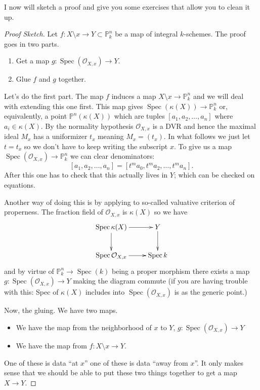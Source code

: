 \documentclass[12pt]{article}
\numberwithin{equation}{section}
\theoremstyle{definition}
\theoremstyle{remark}
\newcommand{\Ocal}{\mathcal{O}}
\newcommand{\PP}{\mathbb{P}}
\newcommand{\Spec}{\operatorname{Spec}}
\begin{document}
I now will sketch a proof and give you some exercises that allow you to clean it up. 
\begin{proof}[Proof Sketch]
	Let $f:X\setminus x \to Y\subset \PP^n_k$ be a map of integral $k$-schemes. 
	The proof goes in two parts. 
	\begin{enumerate}
		\item Get a map $g:\Spec(\Ocal_{X,x}) \to Y$.
		\item Glue $f$ and $g$ together.
	\end{enumerate}
	Let's do the first part. The map $f$ induces a map $X\setminus x \to \PP^n_k$ and we will deal with extending this one first. 
	This map gives $\Spec(\kappa(X)) \to \PP^n_k$ or, equivalently, a point $\PP^n(\kappa(X))$ which are tuples $[a_1,a_2,\ldots,a_n]$ where $a_i\in \kappa(X)$.
	By the normality hypothesis $\Ocal_{X,x}$ is a DVR and hence the maximal ideal $M_x$ has a uniformizer $t_x$ meaning $M_x = (t_x)$.
	In what follows we just let $t=t_x$ so we don't have to keep writing the subscript $x$.
	To give us a map $\Spec(\Ocal_{X,x}) \to \PP^n_k$ we can clear denominators:
	$$[a_1,a_2,\ldots,a_n] = [t^ma_0,t^ma_2,\ldots,t^m a_n].$$
	After this one has to check that this actually lives in $Y$; which can be checked on equations.
	
	Another way of doing this is by applying to so-called valuative criterion of properness. 
	The fraction field of $\Ocal_{X,x}$ is $\kappa(X)$ so we have 
	$$\xymatrix{
		\Spec \kappa(X) \ar[r] \ar[d] & Y \ar[d] \\
		\Spec \Ocal_{X,x} \ar[r] & \Spec k 
	}$$
	and by virtue of $\PP^n_k\to \Spec(k)$ being a proper morphism there exists a map $g:\Spec(\Ocal_{X,x}) \to Y$ making the diagram commute (if you are having trouble with this: Spec of $\kappa(X)$ includes into $\Spec(\Ocal_{X,x})$ is as the generic point.)
	
	Now, the gluing.
	We have two maps. 
	\begin{itemize}
		\item We have the map from the neighborhood of $x$ to $Y$, $g: \Spec(\Ocal_{X,x}) \to Y$ 
		\item We have the map from $f: X\setminus x \to Y$.
	\end{itemize}
	One of these is data ``at $x$'' one of these is data ``away from $x$''.
	It only makes sense that we should be able to put these two things together to get a map $X\to Y$.
	

\end{proof}
\end{document}
